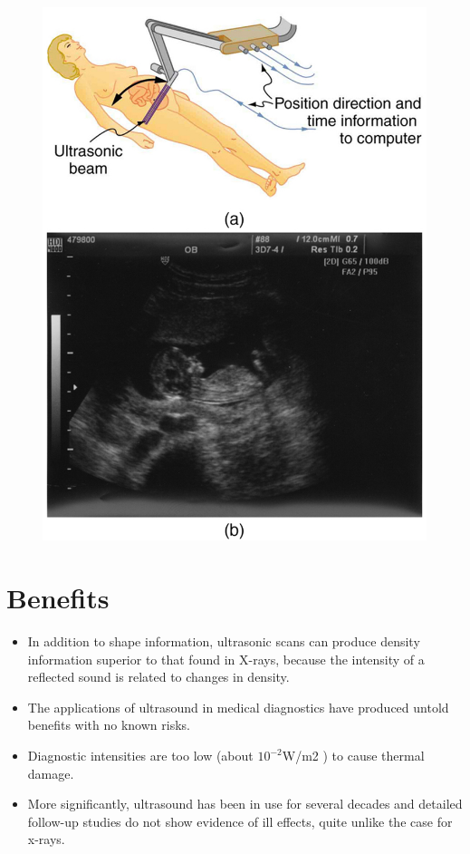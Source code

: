 \documentclass[12pt]{book}
\begin{document}
\begin{figure}
\centering
\includegraphics[scale=0.7]{ultrasoundscan.jpeg}
\end{figure}

\section*{Benefits}
\begin{itemize}
\item In addition to shape information, ultrasonic scans can produce density information superior to that found in X-rays, because the intensity of a reflected sound is related to changes in density.
\item The applications of ultrasound in medical diagnostics have produced untold benefits with no known risks.
\item Diagnostic intensities are too low (about  $10^{-2}$W/m2 ) to cause thermal damage.
\item More significantly, ultrasound has been in use for several decades and detailed follow-up studies do not show evidence of ill effects, quite unlike the case for x-rays.

\end{itemize}
\end{document}
